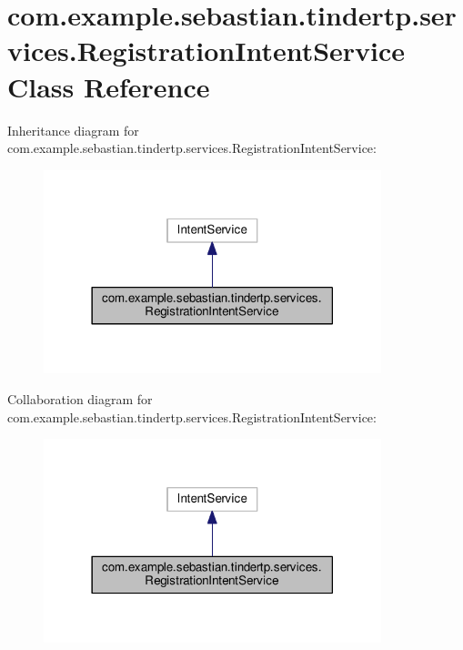 \hypertarget{classcom_1_1example_1_1sebastian_1_1tindertp_1_1services_1_1RegistrationIntentService}{}\section{com.\+example.\+sebastian.\+tindertp.\+services.\+Registration\+Intent\+Service Class Reference}
\label{classcom_1_1example_1_1sebastian_1_1tindertp_1_1services_1_1RegistrationIntentService}


Inheritance diagram for com.\+example.\+sebastian.\+tindertp.\+services.\+Registration\+Intent\+Service\+:
\nopagebreak
\begin{figure}[H]
\begin{center}
\leavevmode
\includegraphics[width=278pt]{classcom_1_1example_1_1sebastian_1_1tindertp_1_1services_1_1RegistrationIntentService__inherit__graph}
\end{center}
\end{figure}


Collaboration diagram for com.\+example.\+sebastian.\+tindertp.\+services.\+Registration\+Intent\+Service\+:
\nopagebreak
\begin{figure}[H]
\begin{center}
\leavevmode
\includegraphics[width=278pt]{classcom_1_1example_1_1sebastian_1_1tindertp_1_1services_1_1RegistrationIntentService__coll__graph}
\end{center}
\end{figure}
